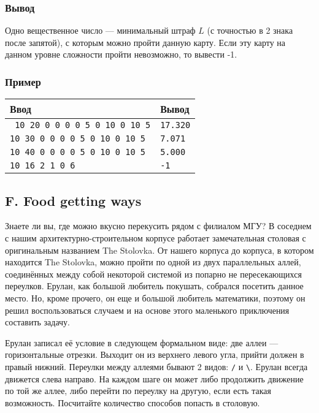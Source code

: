 \documentclass[10pt, a4paper]{article}
\newcommand{\outformat}[1]
{
	\subsubsection*{Вывод} #1
}
\newcommand{\exampleeee}[8]
{
	\subsubsection*{Пример}
	\noindent
	\begin{center}
	\begin{tabularx}{\linewidth}{|X|X|}
	\hline
	Ввод 	& Вывод  	\\
	\hline
	{\tt #1} & {\tt #2}	\\
	\hline
	{\tt #3} & {\tt #4}	\\
	\hline
	{\tt #5} & {\tt #6}	\\
	\hline
	{\tt #7} & {\tt #8}	\\
	\hline
	\end{tabularx}
	\end{center}
}
\begin{document}
\outformat{Одно вещественное число --- минимальный штраф $L$ (с точностью в 2 знака после запятой), с которым можно пройти данную карту. Если эту карту на данном уровне сложности пройти невозможно, то вывести -1.}

\exampleeee{
10 20 \newline
5 \newline
5 0 0 \newline
10 0 0 \newline
10 5 0 \newline
10 10 0 \newline
10 10 5}
{17.320}
{10 30 \newline
5 \newline
5 0 0 \newline
10 0 0 \newline
10 5 0 \newline
10 10 0 \newline
10 10 5}
{7.071}
{10 40 \newline
5 \newline
5 0 0 \newline
10 0 0 \newline
10 5 0 \newline
10 10 0 \newline
10 10 5}
{5.000}
{10 16 \newline
2 \newline
6 2 1 \newline
4 0 6}
{-1}



\subsection*{F. Food getting ways}

Знаете ли вы, где можно вкусно перекусить рядом с филиалом МГУ? В соседнем с нашим архитектурно\--строительном корпусе работает замечательная столовая с оригинальным названием The Stolovka. От нашего корпуса до корпуса, в котором находится The Stolovka, можно пройти по одной из двух параллельных аллей, соединённых между собой некоторой системой из попарно не пересекающихся переулков. Ерулан, как большой любитель покушать, собрался посетить данное место. Но, кроме прочего, он еще и большой любитель математики, поэтому он решил воспользоваться случаем и на основе этого маленького приключения составить задачу. 




Ерулан записал её условие в следующем формальном виде: две аллеи --- горизонтальные отрезки. Выходит он из верхнего левого угла, прийти должен в правый нижний. Переулки между аллеями бывают 2 видов: {\tt /} и {\tt \textbackslash}. Ерулан всегда движется слева направо. На каждом шаге он может либо продолжить движение по той же аллее, либо перейти по переулку на другую, если есть такая возможность. Посчитайте количество способов попасть в столовую.
\end{document}
